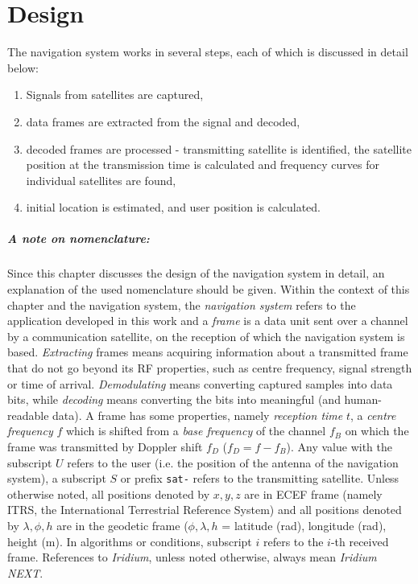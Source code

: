 \chapter{Design}
\newcommand{\param}[1]{\texttt{#1}}


The navigation system works in several steps, each of which is discussed in detail below:
\begin{enumerate}
    \item Signals from satellites are captured,
    \item data frames are extracted from the signal and decoded,
    \item decoded frames are processed - transmitting satellite is identified, the satellite position at the transmission time is calculated and frequency curves for individual satellites are found,
    \item initial location is estimated, and user position is calculated.  
\end{enumerate}

\paragraph{A note on nomenclature:} Since this chapter discusses the design of the navigation system in detail, an explanation of the used nomenclature should be given. Within the context of this chapter and the navigation system, the \textit{navigation system} refers to the application developed in this work and a \textit{frame} is a data unit sent over a channel by a communication satellite, on the reception of which the navigation system is based. \textit{Extracting} frames means acquiring information about a transmitted frame that do not go beyond its RF properties, such as centre frequency, signal strength or time of arrival. \textit{Demodulating} means converting captured samples into data bits, while \textit{decoding} means converting the bits into meaningful (and human-readable data). A frame has some properties, namely \textit{reception time} $t$, a \textit{centre frequency} $f$ which is shifted from a \textit{base frequency} of the channel $f_B$ on which the frame was transmitted by Doppler shift $f_D$ ($f_D = f - f_B$). Any value with the subscript $U$ refers to the user (i.e. the position of the antenna of the navigation system), a subscript $S$ or prefix \texttt{sat-} refers to the transmitting satellite. Unless otherwise noted, all positions denoted by $x, y, z$ are in ECEF frame (namely ITRS, the International Terrestrial Reference System) and all positions denoted by $\lambda, \phi, h$ are in the geodetic frame ($\phi, \lambda, h$ = latitude (rad), longitude (rad), height (m). In algorithms or conditions, subscript $i$ refers to the $i$-th received frame. References to \textit{Iridium}, unless noted otherwise, always mean \textit{Iridium NEXT}.


